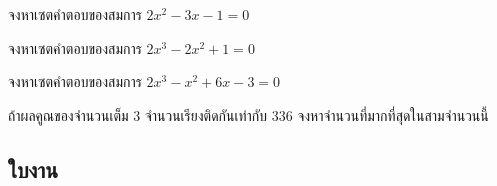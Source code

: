 \vspace{1em}

\begin{examplebox}
	จงหาเซตคำตอบของสมการ $2x^2 - 3x - 1 = 0$
\end{examplebox}
\solution
\vspace{3cm}

\begin{examplebox}
	จงหาเซตคำตอบของสมการ $2x^3 - 2x^2 + 1 = 0$
\end{examplebox}
\solution
\newpage

\begin{examplebox}
	จงหาเซตคำตอบของสมการ $2x^3 - x^2 + 6x - 3 = 0$
\end{examplebox}
\solution
\vspace{4cm}

\begin{examplebox}
	ถ้าผลคูณของจำนวนเต็ม $3$ จำนวนเรียงติดกันเท่ากับ $336$ จงหาจำนวนที่มากที่สุดในสามจำนวนนี้
\end{examplebox}
\solution

\newpage
\subsection*{ใบงาน}


